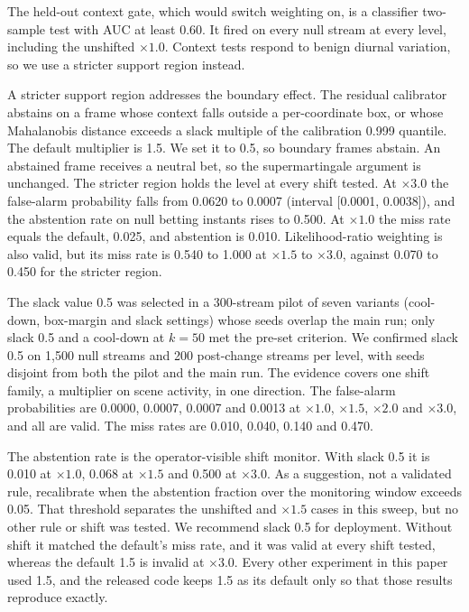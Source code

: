 The held-out context gate, which would switch weighting on, is a classifier two-sample test with AUC at least 0.60. It fired on every null stream at every level, including the unshifted $\times 1.0$. Context tests respond to benign diurnal variation, so we use a stricter support region instead.

A stricter support region addresses the boundary effect. The residual calibrator abstains on a frame whose context falls outside a per-coordinate box, or whose Mahalanobis distance exceeds a slack multiple of the calibration 0.999 quantile. The default multiplier is 1.5. We set it to 0.5, so boundary frames abstain. An abstained frame receives a neutral bet, so the supermartingale argument is unchanged. The stricter region holds the level at every shift tested. At $\times 3.0$ the false-alarm probability falls from 0.0620 to 0.0007 (interval [0.0001, 0.0038]), and the abstention rate on null betting instants rises to 0.500. At $\times 1.0$ the miss rate equals the default, 0.025, and abstention is 0.010. Likelihood-ratio weighting is also valid, but its miss rate is 0.540 to 1.000 at $\times 1.5$ to $\times 3.0$, against 0.070 to 0.450 for the stricter region.

The slack value 0.5 was selected in a 300-stream pilot of seven variants (cool-down, box-margin and slack settings) whose seeds overlap the main run; only slack 0.5 and a cool-down at $k=50$ met the pre-set criterion. We confirmed slack 0.5 on 1,500 null streams and 200 post-change streams per level, with seeds disjoint from both the pilot and the main run. The evidence covers one shift family, a multiplier on scene activity, in one direction. The false-alarm probabilities are 0.0000, 0.0007, 0.0007 and 0.0013 at $\times 1.0$, $\times 1.5$, $\times 2.0$ and $\times 3.0$, and all are valid. The miss rates are 0.010, 0.040, 0.140 and 0.470.

The abstention rate is the operator-visible shift monitor. With slack 0.5 it is 0.010 at $\times 1.0$, 0.068 at $\times 1.5$ and 0.500 at $\times 3.0$. As a suggestion, not a validated rule, recalibrate when the abstention fraction over the monitoring window exceeds 0.05. That threshold separates the unshifted and $\times 1.5$ cases in this sweep, but no other rule or shift was tested. We recommend slack 0.5 for deployment. Without shift it matched the default's miss rate, and it was valid at every shift tested, whereas the default 1.5 is invalid at $\times 3.0$. Every other experiment in this paper used 1.5, and the released code keeps 1.5 as its default only so that those results reproduce exactly.

